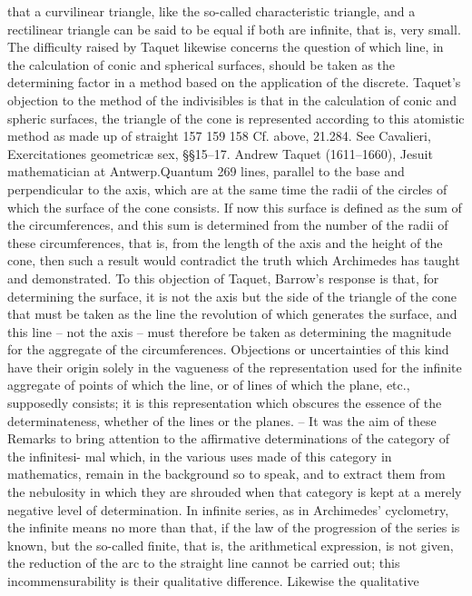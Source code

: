 that a curvilinear triangle, like the so-called characteristic triangle, and a
rectilinear triangle can be said to be equal if both are infinite, that is, very
small. The difficulty raised by Taquet likewise concerns the question of
which line, in the calculation of conic and spherical surfaces, should be
taken as the determining factor in a method based on the application of
the discrete. Taquet’s objection to the method of the indivisibles is that
in the calculation of conic and spheric surfaces, the triangle of the cone
is represented according to this atomistic method as made up of straight
157
159
158 Cf. above, 21.284.
See Cavalieri, Exercitationes geometricæ sex, §§15–17.
Andrew Taquet (1611–1660), Jesuit mathematician at Antwerp.Quantum
269
lines, parallel to the base and perpendicular to the axis, which are at the
same time the radii of the circles of which the surface of the cone consists.
If now this surface is defined as the sum of the circumferences, and this
sum is determined from the number of the radii of these circumferences,
that is, from the length of the axis and the height of the cone, then such
a result would contradict the truth which Archimedes has taught and
demonstrated. To this objection of Taquet, Barrow’s response is that, for
determining the surface, it is not the axis but the side of the triangle of the
cone that must be taken as the line the revolution of which generates the
surface, and this line – not the axis – must therefore be taken as determining
the magnitude for the aggregate of the circumferences.
Objections or uncertainties of this kind have their origin solely in the
vagueness of the representation used for the infinite aggregate of points of
which the line, or of lines of which the plane, etc., supposedly consists; it
is this representation which obscures the essence of the determinateness,
whether of the lines or the planes. – It was the aim of these Remarks to bring
attention to the affirmative determinations of the category of the infinitesi-
mal which, in the various uses made of this category in mathematics, remain
in the background so to speak, and to extract them from the nebulosity in
which they are shrouded when that category is kept at a merely negative
level of determination. In infinite series, as in Archimedes’ cyclometry, the
infinite means no more than that, if the law of the progression of the series
is known, but the so-called finite, that is, the arithmetical expression, is not
given, the reduction of the arc to the straight line cannot be carried out; this
incommensurability is their qualitative difference. Likewise the qualitative
